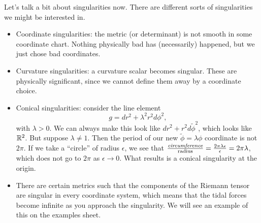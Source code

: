Let's talk a bit about singularities now. There are different sorts of singularities we might be interested in.
\begin{itemize}
    \item Coordinate singularities: the metric (or determinant) is not smooth in some coordinate chart. Nothing physically bad has (necessarily) happened, but we just chose bad coordinates.
    \item Curvature singularities: a curvature scalar becomes singular. These are physically significant, since we cannot define them away by a coordinate choice.
    \item Conical singularities: consider the line element
    \begin{equation}
        g=dr^2 +\lambda^2 r^2 d\phi^2,
    \end{equation}
    with $\lambda>0$. We can always make this look like $dr^2+r^2 d\tilde \phi^2$, which looks like $\mathbb{R}^2$. But suppose $\lambda \neq 1$. Then the period of our new $\tilde \phi=\lambda \phi$ coordinate is not $2\pi$. If we take a ``circle'' of radius $\epsilon$, we see that $\frac{\emph{circumference}}{\text{radius}}=\frac{2\pi \lambda \epsilon}{\epsilon}=2\pi \lambda$, which does not go to $2\pi$ as $\epsilon\to 0$. What results is a conical singularity at the origin.
    \item There are certain metrics such that the components of the Riemann tensor are singular in every coordinate system, which means that the tidal forces become infinite as you approach the singularity. We will see an example of this on the examples sheet.
\end{itemize}

